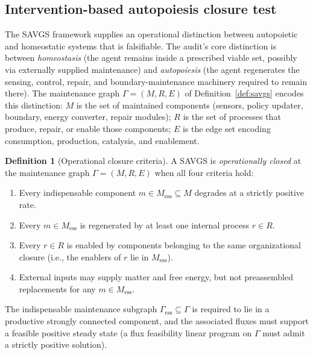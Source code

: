 \documentclass[11pt,a4paper]{article}
\theoremstyle{plain}
\theoremstyle{definition}
\newtheorem{definition}[theorem]{Definition}
\theoremstyle{remark}
\begin{document}
\subsection{Intervention-based autopoiesis closure test}

\label{sec:kappa-closure}
The SAVGS framework supplies an operational distinction between
autopoietic and homeostatic systems that is falsifiable. The audit's
core distinction is between \emph{homeostasis} (the agent remains
inside a prescribed viable set, possibly via externally supplied
maintenance) and \emph{autopoiesis} (the agent regenerates the sensing,
control, repair, and boundary-maintenance machinery required to remain
there). The maintenance graph $\Gamma = (M, R, E)$ of
Definition~\ref{def:savgs} encodes this distinction: $M$ is the set of
maintained components (sensors, policy updater, boundary, energy
converter, repair modules); $R$ is the set of processes that produce,
repair, or enable those components; $E$ is the edge set encoding
consumption, production, catalysis, and enablement.

\begin{definition}[Operational closure criteria]
\label{def:closure-criteria}
A SAVGS is \emph{operationally closed} at the maintenance graph
$\Gamma = (M, R, E)$ when all four criteria hold:
\begin{enumerate}[leftmargin=*,itemsep=2pt]
\item Every indispensable component $m \in M_{\mathrm{ess}} \subseteq
M$ degrades at a strictly positive rate.
\item Every $m \in M_{\mathrm{ess}}$ is regenerated by at least one
internal process $r \in R$.
\item Every $r \in R$ is enabled by components belonging to the same
organizational closure (i.e., the enablers of $r$ lie in
$M_{\mathrm{ess}}$).
\item External inputs may supply matter and free energy, but not
preassembled replacements for any $m \in M_{\mathrm{ess}}$.
\end{enumerate}
The indispensable maintenance subgraph
$\Gamma_{\mathrm{ess}} \subseteq \Gamma$ is required to lie in a
productive strongly connected component, and the associated fluxes
must support a feasible positive steady state (a flux feasibility
linear program on $\Gamma$ must admit a strictly positive solution).
\end{definition}
\end{document}

